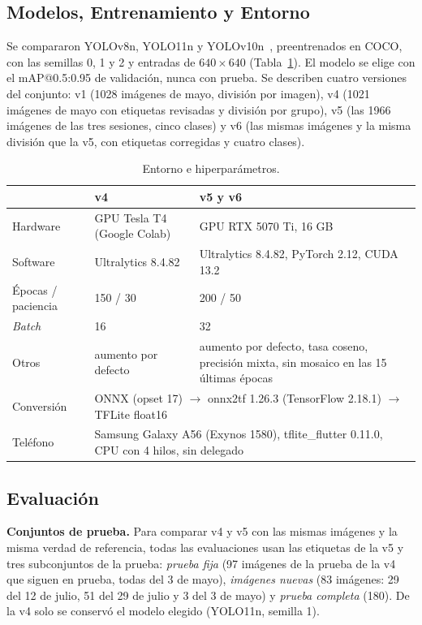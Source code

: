 \documentclass[sensors,article,submit,pdftex,moreauthors]{Definitions/mdpi}
\begin{document}
\subsection{\color{blue} Modelos, Entrenamiento y Entorno}

{\color{blue} Se compararon YOLOv8n, YOLO11n y YOLOv10n~\cite{Jocher2023,Jocher2024,Wang2024v10}, preentrenados en COCO, con las semillas 0, 1 y 2 y entradas de $640\times640$ (Tabla~\ref{tab:entorno}).} {\color{blue} El modelo se elige con el mAP@0.5:0.95 de validación, nunca con prueba.} {\color{blue} Se describen cuatro versiones del conjunto: v1 (1028 imágenes de mayo, división por imagen), v4 (1021 imágenes de mayo con etiquetas revisadas y división por grupo), v5 (las 1966 imágenes de las tres sesiones, cinco clases) y v6 (las mismas imágenes y la misma división que la v5, con etiquetas corregidas y cuatro clases).}

\begin{table}[H]\color{blue}
\caption{Entorno e hiperparámetros.\label{tab:entorno}}
\begin{tabularx}{\textwidth}{lXX}
\toprule
& \textbf{v4} & \textbf{v5 y v6}\\
\midrule
Hardware & GPU Tesla T4 (Google Colab) & GPU RTX 5070 Ti, 16 GB\\
Software & Ultralytics 8.4.82 & Ultralytics 8.4.82, PyTorch 2.12, CUDA 13.2\\
Épocas / paciencia & 150 / 30 & 200 / 50\\
\emph{Batch} & 16 & 32\\
Otros & aumento por defecto & aumento por defecto, tasa coseno, precisión mixta, sin mosaico en las 15 últimas épocas\\
\midrule
Conversión & \multicolumn{2}{p{0.72\textwidth}}{ONNX (opset 17) $\rightarrow$ onnx2tf 1.26.3 (TensorFlow 2.18.1) $\rightarrow$ TFLite float16}\\
Teléfono & \multicolumn{2}{p{0.72\textwidth}}{Samsung Galaxy A56 (Exynos 1580), tflite\_flutter 0.11.0, CPU con 4 hilos, sin delegado}\\
\bottomrule
\end{tabularx}
\end{table}

\subsection{\color{blue} Evaluación}

{\color{blue} \textbf{Conjuntos de prueba.} Para comparar v4 y v5 con las mismas imágenes y la misma verdad de referencia, todas las evaluaciones usan las etiquetas de la v5 y tres subconjuntos de la prueba:} {\color{blue} \emph{prueba fija} (97 imágenes de la prueba de la v4 que siguen en prueba, todas del 3 de mayo), \emph{imágenes nuevas} (83 imágenes:} {\color{blue} 29 del 12 de julio, 51 del 29 de julio y 3 del 3 de mayo) y \emph{prueba completa} (180).} {\color{blue} De la v4 solo se conservó el modelo elegido (YOLO11n, semilla 1).}
\end{document}

